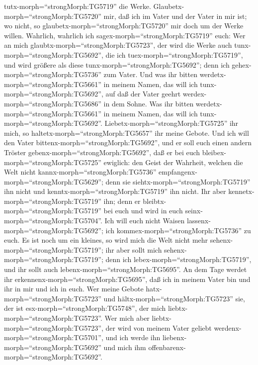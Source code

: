 tutx-morph=``strongMorph:TG5719'' die Werke. 
Glaubetx-morph=``strongMorph:TG5720'' mir, daß ich im Vater und der
Vater in mir ist; wo nicht, so glaubetx-morph=``strongMorph:TG5720'' mir
doch um der Werke willen.  Wahrlich, wahrlich ich
sagex-morph=``strongMorph:TG5719'' euch: Wer an mich
glaubtx-morph=``strongMorph:TG5723'', der wird die Werke auch
tunx-morph=``strongMorph:TG5692'', die ich
tuex-morph=``strongMorph:TG5719'', und wird größere als diese
tunx-morph=``strongMorph:TG5692''; denn ich
gehex-morph=``strongMorph:TG5736'' zum Vater.  Und was ihr
bitten werdetx-morph=``strongMorph:TG5661'' in meinem Namen, das will
ich tunx-morph=``strongMorph:TG5692'', auf daß der Vater geehrt
werdex-morph=``strongMorph:TG5686'' in dem Sohne.  Was ihr
bitten werdetx-morph=``strongMorph:TG5661'' in meinem Namen, das will
ich tunx-morph=``strongMorph:TG5692''. 
Liebetx-morph=``strongMorph:TG5725'' ihr mich, so
haltetx-morph=``strongMorph:TG5657'' ihr meine Gebote.  Und
ich will den Vater bittenx-morph=``strongMorph:TG5692'', und er soll
euch einen andern Tröster gebenx-morph=``strongMorph:TG5692'', daß er
bei euch bleibex-morph=``strongMorph:TG5725'' ewiglich: 
den Geist der Wahrheit, welchen die Welt nicht
kannx-morph=``strongMorph:TG5736''
empfangenx-morph=``strongMorph:TG5629''; denn sie
siehtx-morph=``strongMorph:TG5719'' ihn nicht und
kenntx-morph=``strongMorph:TG5719'' ihn nicht. Ihr aber
kennetx-morph=``strongMorph:TG5719'' ihn; denn er
bleibtx-morph=``strongMorph:TG5719'' bei euch und wird in euch
seinx-morph=``strongMorph:TG5704''.  Ich will euch nicht
Waisen lassenx-morph=``strongMorph:TG5692''; ich
kommex-morph=``strongMorph:TG5736'' zu euch.  Es ist noch
um ein kleines, so wird mich die Welt nicht mehr
sehenx-morph=``strongMorph:TG5719''; ihr aber sollt mich
sehenx-morph=``strongMorph:TG5719''; denn ich
lebex-morph=``strongMorph:TG5719'', und ihr sollt auch
lebenx-morph=``strongMorph:TG5695''.  An dem Tage werdet
ihr erkennenx-morph=``strongMorph:TG5695'', daß ich in meinem Vater bin
und ihr in mir und ich in euch.  Wer meine Gebote
hatx-morph=``strongMorph:TG5723'' und hältx-morph=``strongMorph:TG5723''
sie, der ist esx-morph=``strongMorph:TG5748'', der mich
liebtx-morph=``strongMorph:TG5723''. Wer mich aber
liebtx-morph=``strongMorph:TG5723'', der wird von meinem Vater geliebt
werdenx-morph=``strongMorph:TG5701'', und ich werde ihn
liebenx-morph=``strongMorph:TG5692'' und mich ihm
offenbarenx-morph=``strongMorph:TG5692''. 
